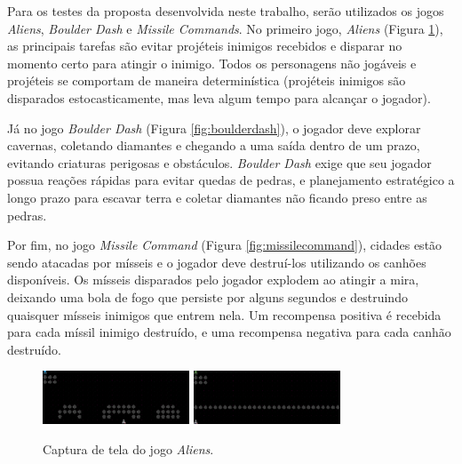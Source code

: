 
Para os testes da proposta desenvolvida neste trabalho, serão utilizados os jogos \textit{Aliens}, \textit{Boulder Dash} e \textit{Missile Commands}. No primeiro jogo, \textit{Aliens} (Figura \ref{fig:aliens}), as principais tarefas são evitar projéteis inimigos recebidos e disparar no momento certo para atingir o inimigo. Todos os personagens não jogáveis e projéteis se comportam de maneira determinística (projéteis inimigos são disparados estocasticamente, mas leva algum tempo para alcançar o jogador). 

Já no jogo \textit{Boulder Dash} (Figura \ref{fig:boulderdash}), o jogador deve explorar cavernas, coletando diamantes e chegando a uma saída dentro de um prazo, evitando criaturas perigosas e obstáculos. \textit{Boulder Dash} exige que seu jogador possua reações rápidas para evitar quedas de pedras, e planejamento estratégico a longo prazo  para escavar terra e coletar diamantes não ficando preso entre as pedras. 

Por fim, no jogo \textit{Missile Command} (Figura \ref{fig:missilecommand}), cidades estão sendo atacadas por mísseis e o jogador deve destruí-los utilizando os canhões disponíveis. Os mísseis disparados pelo jogador explodem ao atingir a mira, deixando uma bola de fogo que persiste por alguns segundos e destruindo quaisquer mísseis inimigos que entrem nela. Um recompensa positiva é recebida para cada míssil inimigo destruído, e uma recompensa negativa para cada canhão destruído.

\begin{figure}[h]
  \centering
  \subfigure
  {
    \includegraphics[width=0.39\textwidth]{./fig/gvgai-aliens-lvl0-v0}
    \label{subfig:aliens1}
  } 
  \subfigure
  {
    \includegraphics[width=0.39\textwidth]{./fig/gvgai-aliens-lvl4-v0}
    \label{subfig:aliens3}
  }
  \caption{Captura de tela do jogo \textit{Aliens}.}
  \label{fig:aliens}
\end{figure}

